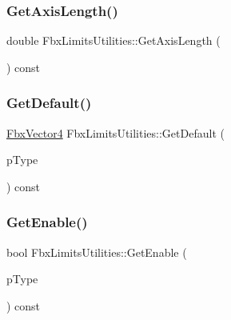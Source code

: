 \subsubsection{\texorpdfstring{Get\+Axis\+Length()}{GetAxisLength()}}
{\footnotesize\ttfamily double Fbx\+Limits\+Utilities\+::\+Get\+Axis\+Length (\begin{DoxyParamCaption}{ }\end{DoxyParamCaption}) const}

\mbox{\label{class_fbx_limits_utilities_abe24c72b27fe512b2e1ea982b804d423}} 
\subsubsection{\texorpdfstring{Get\+Default()}{GetDefault()}}
{\footnotesize\ttfamily \hyperlink{class_fbx_vector4}{Fbx\+Vector4} Fbx\+Limits\+Utilities\+::\+Get\+Default (\begin{DoxyParamCaption}\item[{\hyperlink{class_fbx_limits_utilities_aa55167751039b3d64b56cb7e58f2e62c}{E\+Type}}]{p\+Type }\end{DoxyParamCaption}) const}

\mbox{\label{class_fbx_limits_utilities_a3224344ce5636d18f22d8ec8a327bba6}} 
\subsubsection{\texorpdfstring{Get\+Enable()}{GetEnable()}}
{\footnotesize\ttfamily bool Fbx\+Limits\+Utilities\+::\+Get\+Enable (\begin{DoxyParamCaption}\item[{\hyperlink{class_fbx_limits_utilities_aa55167751039b3d64b56cb7e58f2e62c}{E\+Type}}]{p\+Type }\end{DoxyParamCaption}) const}

\mbox{\label{class_fbx_limits_utilities_a89a48af2f22f1996c447460bbe7e80fa}} 
